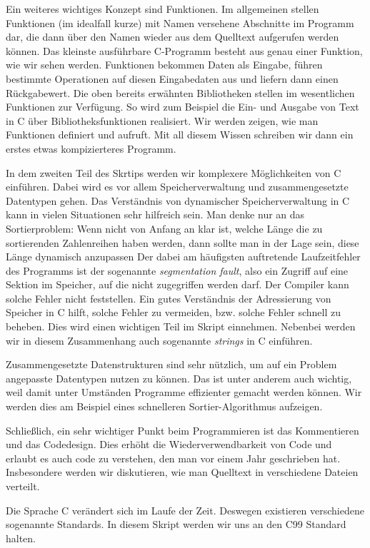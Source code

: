 Ein weiteres wichtiges Konzept sind Funktionen.
Im allgemeinen stellen Funktionen (im idealfall kurze) mit Namen versehene Abschnitte im Programm dar, die dann über den Namen wieder aus dem Quelltext aufgerufen werden können.
Das kleinste ausführbare C-Programm besteht aus genau einer Funktion, wie wir sehen werden.
Funktionen bekommen Daten als Eingabe, führen bestimmte Operationen auf diesen Eingabedaten aus und liefern dann einen Rückgabewert.
Die oben bereits erwähnten Bibliotheken stellen im wesentlichen Funktionen zur Verfügung.
So wird zum Beispiel die Ein- und Ausgabe von Text in C über Bibliotheksfunktionen realisiert.
Wir werden zeigen, wie man Funktionen definiert und aufruft.
Mit all diesem Wissen schreiben wir dann ein erstes etwas kompizierteres Programm.

In dem zweiten Teil des Skrtips werden wir komplexere Möglichkeiten von C einführen.
Dabei wird es vor allem Speicherverwaltung und zusammengesetzte Datentypen gehen.
Das Verständnis von dynamischer Speicherverwaltung in C kann in vielen Situationen sehr hilfreich sein.
Man denke nur an das Sortierproblem: Wenn nicht von Anfang an klar ist, welche Länge die zu sortierenden Zahlenreihen haben werden, dann sollte man in der Lage sein, diese Länge dynamisch anzupassen
Der dabei am häufigsten auftretende Laufzeitfehler des Programms ist der sogenannte \emph{segmentation fault}, also ein Zugriff auf eine Sektion im Speicher, auf die nicht zugegriffen werden darf.
Der Compiler kann solche Fehler nicht feststellen.
Ein gutes Verständnis der Adressierung von Speicher in C hilft, solche Fehler zu vermeiden, bzw. solche Fehler schnell zu beheben.
Dies wird einen wichtigen Teil im Skript einnehmen.
Nebenbei werden wir in diesem Zusammenhang auch sogenannte \emph{strings} in C einführen.

Zusammengesetzte Datenstrukturen sind sehr nützlich, um auf ein Problem angepasste Datentypen nutzen zu können. 
Das ist unter anderem auch wichtig, weil damit unter Umständen Programme effizienter gemacht werden können.
Wir werden dies am Beispiel eines schnelleren Sortier-Algorithmus aufzeigen.

Schließlich, ein sehr wichtiger Punkt beim Programmieren ist das Kommentieren und das Codedesign.
Dies erhöht die Wiederverwendbarkeit von Code und erlaubt es auch code zu verstehen, den man vor einem Jahr geschrieben hat.
Insbesondere werden wir diskutieren, wie man Quelltext in verschiedene Dateien verteilt.

Die Sprache C verändert sich im Laufe der Zeit.
Deswegen existieren verschiedene sogenannte Standards.
In diesem Skript werden wir uns an den C99 Standard halten.

